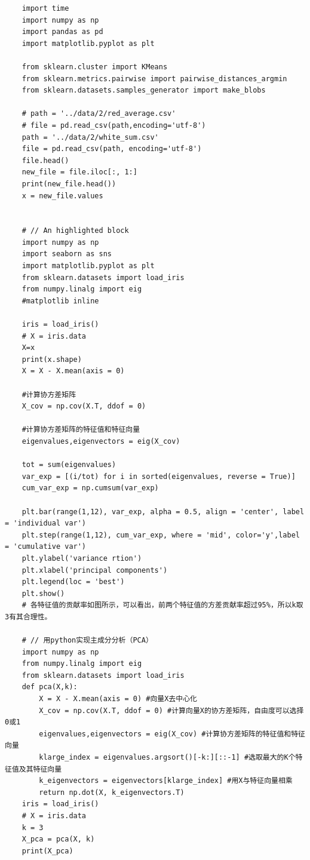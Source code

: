 \documentclass[UTF8]{ctexart}
\begin{document}
\lstset{language=python}
\begin{lstlisting}
	import time
	import numpy as np
	import pandas as pd
	import matplotlib.pyplot as plt
	
	from sklearn.cluster import KMeans
	from sklearn.metrics.pairwise import pairwise_distances_argmin
	from sklearn.datasets.samples_generator import make_blobs
	
	# path = '../data/2/red_average.csv'
	# file = pd.read_csv(path,encoding='utf-8')
	path = '../data/2/white_sum.csv'
	file = pd.read_csv(path, encoding='utf-8')
	file.head()
	new_file = file.iloc[:, 1:]
	print(new_file.head())
	x = new_file.values
	
	
	# // An highlighted block
	import numpy as np
	import seaborn as sns
	import matplotlib.pyplot as plt
	from sklearn.datasets import load_iris
	from numpy.linalg import eig
	#matplotlib inline
	
	iris = load_iris()
	# X = iris.data
	X=x
	print(x.shape)
	X = X - X.mean(axis = 0)
	
	#计算协方差矩阵
	X_cov = np.cov(X.T, ddof = 0)
	
	#计算协方差矩阵的特征值和特征向量
	eigenvalues,eigenvectors = eig(X_cov)
	
	tot = sum(eigenvalues)
	var_exp = [(i/tot) for i in sorted(eigenvalues, reverse = True)]
	cum_var_exp = np.cumsum(var_exp)
	
	plt.bar(range(1,12), var_exp, alpha = 0.5, align = 'center', label = 'individual var')
	plt.step(range(1,12), cum_var_exp, where = 'mid', color='y',label = 'cumulative var')
	plt.ylabel('variance rtion')
	plt.xlabel('principal components')
	plt.legend(loc = 'best')
	plt.show()
	# 各特征值的贡献率如图所示，可以看出，前两个特征值的方差贡献率超过95%，所以k取3有其合理性。
	
	# // 用python实现主成分分析（PCA）
	import numpy as np
	from numpy.linalg import eig
	from sklearn.datasets import load_iris
	def pca(X,k):
		X = X - X.mean(axis = 0) #向量X去中心化
		X_cov = np.cov(X.T, ddof = 0) #计算向量X的协方差矩阵，自由度可以选择0或1
		eigenvalues,eigenvectors = eig(X_cov) #计算协方差矩阵的特征值和特征向量
		klarge_index = eigenvalues.argsort()[-k:][::-1] #选取最大的K个特征值及其特征向量
		k_eigenvectors = eigenvectors[klarge_index] #用X与特征向量相乘
		return np.dot(X, k_eigenvectors.T)
	iris = load_iris()
	# X = iris.data
	k = 3
	X_pca = pca(X, k)
	print(X_pca)
		
\end{lstlisting}
\end{document}
